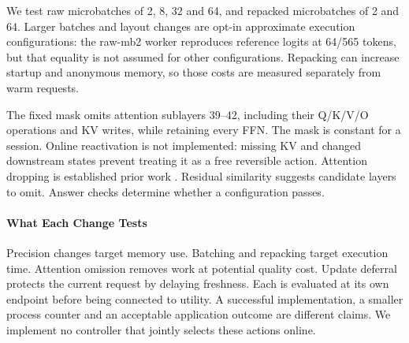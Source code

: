 We test raw microbatches of 2, 8, 32 and 64, and repacked microbatches of 2 and 64. Larger batches and
layout changes are opt-in approximate execution configurations: the raw-mb2
worker reproduces reference logits at 64/565 tokens, but that equality is not
assumed for other configurations. Repacking can increase startup and anonymous
memory, so those costs are measured separately from warm requests.

The fixed mask omits attention sublayers 39--42, including their Q/K/V/O
operations and KV writes, while retaining every FFN. The mask is constant
for a session. Online reactivation is not implemented: missing KV and changed
downstream states prevent treating it as a free reversible action. Attention
dropping is established prior work \citep{attentiondrop}. Residual similarity suggests candidate layers to omit. Answer checks determine
whether a configuration passes.

\paragraph{What Each Change Tests}
Precision changes target memory use. Batching and repacking target execution time.
Attention omission removes work at potential quality cost. Update deferral
protects the current request by delaying freshness. Each is evaluated at its
own endpoint before being connected to utility. A successful implementation,
a smaller process counter and an acceptable application outcome are different
claims. We implement no controller that jointly selects these actions online.
